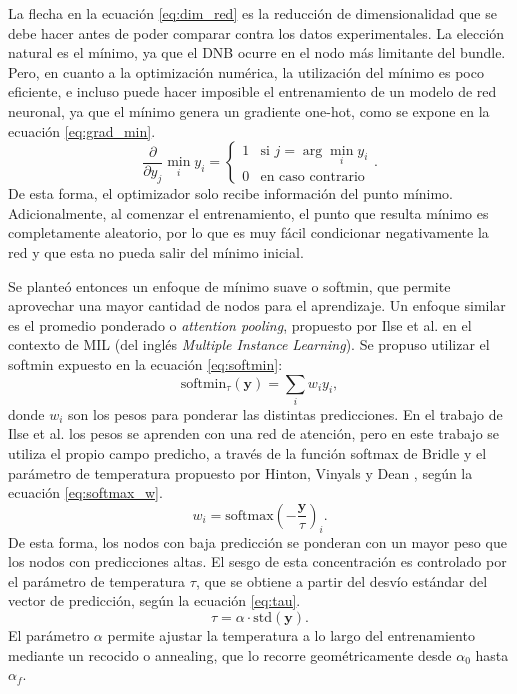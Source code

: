 La flecha en la ecuación \ref{eq:dim_red} es la reducción de dimensionalidad que se debe hacer antes de poder comparar contra los datos experimentales. La elección natural es el mínimo, ya que el DNB ocurre en el nodo más limitante del bundle. Pero, en cuanto a la optimización numérica, la utilización del mínimo es poco eficiente, e incluso puede hacer imposible el entrenamiento de un modelo de red neuronal, ya que el mínimo genera un gradiente one-hot, como se expone en la ecuación \ref{eq:grad_min}.
\begin{equation}
    \label{eq:grad_min}
    \frac{\partial}{\partial y_j}\min_i y_i =
    \begin{cases}
    1 & \text{si } j = \arg\min_i y_i \\
    0 & \text{en caso contrario}
    \end{cases}.
\end{equation}
De esta forma, el optimizador solo recibe información del punto mínimo. Adicionalmente, al comenzar el entrenamiento, el punto que resulta mínimo es completamente aleatorio, por lo que es muy fácil condicionar negativamente la red y que esta no pueda salir del mínimo inicial.



Se planteó entonces un enfoque de mínimo suave o softmin, que permite aprovechar una mayor cantidad de nodos para el aprendizaje. Un enfoque similar es el promedio ponderado o \textit{attention pooling}, propuesto por Ilse et al. \citep{ilse2018attention} en el contexto de MIL (del inglés \textit{Multiple Instance Learning}). Se propuso utilizar el softmin expuesto en la ecuación \ref{eq:softmin}:
\begin{equation}
    \label{eq:softmin}
    \mathrm{softmin}_\tau (\mathbf{y}) = \sum_i w_i y_i,
\end{equation}
donde $w_i$ son los pesos para ponderar las distintas predicciones. En el trabajo de Ilse et al. los pesos se aprenden con una red de atención, pero en este trabajo se utiliza el propio campo predicho, a través de la función softmax de Bridle \citep{bridle1990softmax} y el parámetro de temperatura propuesto por Hinton, Vinyals y Dean \citep{hinton2015distilling}, según la ecuación \ref{eq:softmax_w}.
\begin{equation}
    \label{eq:softmax_w}
    w_i = \mathrm{softmax}\left(-\frac{\mathbf{y}}{\tau}\right)_i .
\end{equation}
De esta forma, los nodos con baja predicción se ponderan con un mayor peso que los nodos con predicciones altas. El sesgo de esta concentración es controlado por el parámetro de temperatura $\tau$, que se obtiene a partir del desvío estándar del vector de predicción, según la ecuación \ref{eq:tau}.
\begin{equation}
    \label{eq:tau}
    \tau = \alpha \cdot \mathrm{std}(\mathbf{y}).
\end{equation}
El parámetro $\alpha$ permite ajustar la temperatura a lo largo del entrenamiento mediante un recocido o annealing, que lo recorre geométricamente desde $\alpha_0$ hasta $\alpha_f$.

